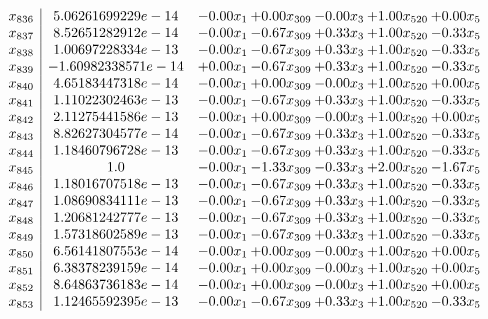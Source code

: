 \documentclass[8pt]{article}
\begin{document}
\[\begin{array}{c| c c@{\hskip 2pt} c@{\hskip 2pt} c@{\hskip 2pt} c@{\hskip 2pt} c@{\hskip 2pt} }
 x_{836}   &  5.06261699229e-14 & -0.00 x_{1} & +  0.00 x_{309} & -0.00 x_{3} & +  1.00 x_{520} & +  0.00 x_{5}\\
 x_{837}   &  8.52651282912e-14 & -0.00 x_{1} & -0.67 x_{309} & +  0.33 x_{3} & +  1.00 x_{520} & -0.33 x_{5}\\
 x_{838}   &  1.00697228334e-13 & -0.00 x_{1} & -0.67 x_{309} & +  0.33 x_{3} & +  1.00 x_{520} & -0.33 x_{5}\\
 x_{839}   &  -1.60982338571e-14 & +  0.00 x_{1} & -0.67 x_{309} & +  0.33 x_{3} & +  1.00 x_{520} & -0.33 x_{5}\\
 x_{840}   &  4.65183447318e-14 & -0.00 x_{1} & +  0.00 x_{309} & -0.00 x_{3} & +  1.00 x_{520} & +  0.00 x_{5}\\
 x_{841}   &  1.11022302463e-13 & -0.00 x_{1} & -0.67 x_{309} & +  0.33 x_{3} & +  1.00 x_{520} & -0.33 x_{5}\\
 x_{842}   &  2.11275441586e-13 & -0.00 x_{1} & +  0.00 x_{309} & -0.00 x_{3} & +  1.00 x_{520} & +  0.00 x_{5}\\
 x_{843}   &  8.82627304577e-14 & -0.00 x_{1} & -0.67 x_{309} & +  0.33 x_{3} & +  1.00 x_{520} & -0.33 x_{5}\\
 x_{844}   &  1.18460796728e-13 & -0.00 x_{1} & -0.67 x_{309} & +  0.33 x_{3} & +  1.00 x_{520} & -0.33 x_{5}\\
 x_{845}   &  1.0 & -0.00 x_{1} & -1.33 x_{309} & -0.33 x_{3} & +  2.00 x_{520} & -1.67 x_{5}\\
 x_{846}   &  1.18016707518e-13 & -0.00 x_{1} & -0.67 x_{309} & +  0.33 x_{3} & +  1.00 x_{520} & -0.33 x_{5}\\
 x_{847}   &  1.08690834111e-13 & -0.00 x_{1} & -0.67 x_{309} & +  0.33 x_{3} & +  1.00 x_{520} & -0.33 x_{5}\\
 x_{848}   &  1.20681242777e-13 & -0.00 x_{1} & -0.67 x_{309} & +  0.33 x_{3} & +  1.00 x_{520} & -0.33 x_{5}\\
 x_{849}   &  1.57318602589e-13 & -0.00 x_{1} & -0.67 x_{309} & +  0.33 x_{3} & +  1.00 x_{520} & -0.33 x_{5}\\
 x_{850}   &  6.56141807553e-14 & -0.00 x_{1} & +  0.00 x_{309} & -0.00 x_{3} & +  1.00 x_{520} & +  0.00 x_{5}\\
 x_{851}   &  6.38378239159e-14 & -0.00 x_{1} & +  0.00 x_{309} & -0.00 x_{3} & +  1.00 x_{520} & +  0.00 x_{5}\\
 x_{852}   &  8.64863736183e-14 & -0.00 x_{1} & +  0.00 x_{309} & -0.00 x_{3} & +  1.00 x_{520} & +  0.00 x_{5}\\
 x_{853}   &  1.12465592395e-13 & -0.00 x_{1} & -0.67 x_{309} & +  0.33 x_{3} & +  1.00 x_{520} & -0.33 x_{5}\\

\end{array}\]
\end{document}
